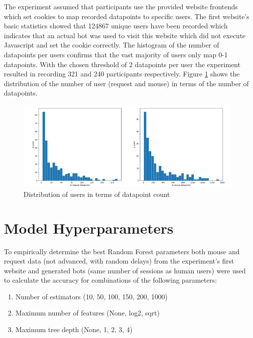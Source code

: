 \documentclass[
    fontsize=12pt,
    headings=small,
    parskip=half,           %
    bibliography=totoc,
    numbers=noenddot,       %
    open=any,               %
    final                   %
]{scrreprt}
\begin{document}
The experiment assumed that participants use the provided website frontends which set cookies to map recorded datapoints to specific users. The first website's basic statistics showed that 124867 unique users have been recorded which indicates that an actual bot was used to visit this website which did not execute Javascript and set the cookie correctly. The histogram of the number of datapoints per users confirms that the vast majority of users only map 0-1 datapoints. With the chosen threshold of 2 datapoints per user the experiment resulted in recording 321 and 240 participants respectively. Figure \ref{fig:user_dp_hist} shows the distribution of the number of user (request and mouse) in terms of the number of datapoints.

\begin{figure}[h]
	\includegraphics[width=\textwidth]{figures/user_dp_hist.png}
	\caption{Distribution of users in terms of datapoint count}
	\label{fig:user_dp_hist}
\end{figure}


\section{Model Hyperparameters}

To empirically determine the best Random Forest parameters both mouse and request data (not advanced, with random delays) from the experiment's first website and generated bots (same number of sessions as human users) were used to calculate the accuracy for combinations of the following parameters:

\begin{enumerate}
	\item Number of estimators (10, 50, 100, 150, 200, 1000)
	\item Maximum number of features (None, log2, sqrt)
	\item Maximum tree depth (None, 1, 2, 3, 4)
\end{enumerate}
\end{document}
